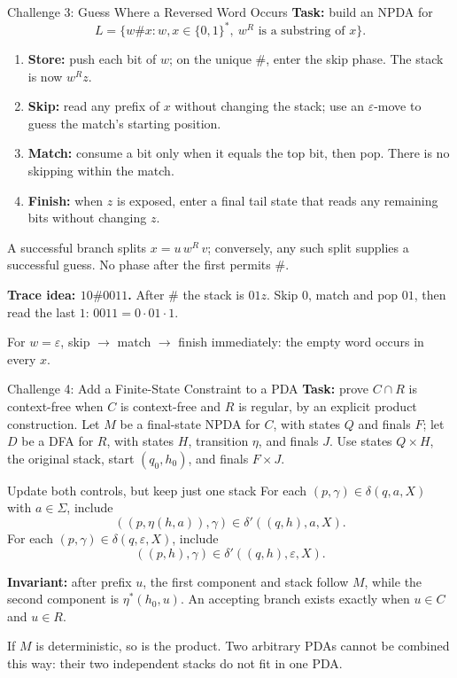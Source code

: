 \documentclass[10pt]{beamer}
\begin{document}
\begin{frame}{Challenge 3: Guess Where a Reversed Word Occurs}
  \small
  \textbf{Task:} build an NPDA for
  \[
    L=\{w\#x:w,x\in\{0,1\}^*,\ w^R\text{ is a substring of }x\}.
  \]
  \pause
  \begin{enumerate}\setlength\itemsep{1pt}
    \item \textbf{Store:} push each bit of $w$; on the unique $\#$,
      enter the skip phase. The stack is now $w^Rz$.
    \item \textbf{Skip:} read any prefix of $x$ without changing the stack;
      use an $\varepsilon$-move to guess the match's starting position.
    \item \textbf{Match:} consume a bit only when it equals the top bit,
      then pop. There is no skipping within the match.
    \item \textbf{Finish:} when $z$ is exposed, enter a final tail state
      that reads any remaining bits without changing $z$.
  \end{enumerate}
  \pause
  A successful branch splits $x=u\,w^R\,v$; conversely, any such split
  supplies a successful guess. No phase after the first permits $\#$.
  \par\smallskip
  \textbf{Trace idea: $10\#0011$.} After $\#$ the stack is $01z$.
  Skip $0$, match and pop $01$, then read the last $1$:
  $0011=0\cdot01\cdot1$.
  \par\smallskip
  For $w=\varepsilon$, skip $\to$ match $\to$ finish immediately:
  the empty word occurs in every $x$.
\end{frame}

\begin{frame}{Challenge 4: Add a Finite-State Constraint to a PDA}
  \small
  \textbf{Task:} prove $C\cap R$ is context-free when $C$ is context-free
  and $R$ is regular, by an explicit product construction.
  \pause
  Let $M$ be a final-state NPDA for $C$, with states $Q$ and finals $F$;
  let $D$ be a DFA for $R$, with states $H$, transition $\eta$, and finals $J$.
  Use states $Q\times H$, the original stack, start $(q_0,h_0)$, and finals $F\times J$.
  \begin{block}{Update both controls, but keep just one stack}
    For each $(p,\gamma)\in\delta(q,a,X)$ with $a\in\Sigma$, include
    \[
      ((p,\eta(h,a)),\gamma)\in\delta'((q,h),a,X).
    \]
    For each $(p,\gamma)\in\delta(q,\varepsilon,X)$, include
    \[
      ((p,h),\gamma)\in\delta'((q,h),\varepsilon,X).
    \]
  \end{block}
  \pause
  \textbf{Invariant:} after prefix $u$, the first component and stack
  follow $M$, while the second component is $\eta^*(h_0,u)$.
  An accepting branch exists exactly when $u\in C$ and $u\in R$.
  \par\smallskip
  If $M$ is deterministic, so is the product. Two arbitrary PDAs cannot
  be combined this way: their two independent stacks do not fit in one PDA.
\end{frame}
\end{document}
